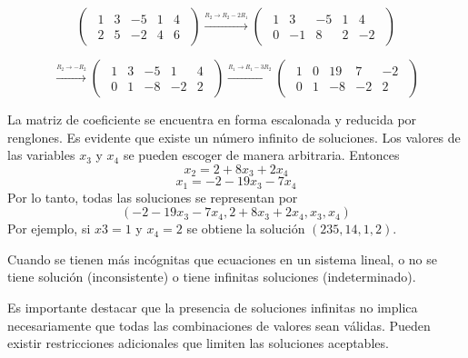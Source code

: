 \documentclass{article}
\begin{document}
\begin{equation*}
    \begin{pmatrix}
        \begin{array}{rrrr|r}
            1 & 3 & -5 & 1 & 4\\
            2 & 5 & -2 & 4 & 6
        \end{array}
    \end{pmatrix}
\xrightarrow{\stackrel{R_2 \rightarrow R_2 - 2R_1}{}}
    \begin{pmatrix}
        \begin{array}{rrrr|r}
            1 & 3 & -5 & 1 & 4\\
            0 & -1 & 8 & 2 & -2
        \end{array}
    \end{pmatrix}
\end{equation*}

\begin{equation*}
    \xrightarrow{\stackrel{R_2 \rightarrow -R_2}{}}
    \begin{pmatrix}
        \begin{array}{rrrr|r}
            1 & 3 & -5 & 1 & 4\\
            0 & 1 & -8 & -2 & 2
        \end{array}
    \end{pmatrix}
\xrightarrow{\stackrel{R_1 \rightarrow R_1 - 3R_2}{}}
    \begin{pmatrix}
        \begin{array}{rrrr|r}
            1 & 0 & 19 & 7 & -2\\
            0 & 1 & -8 & -2 & 2
        \end{array}
    \end{pmatrix}
\end{equation*}

La matriz de coeficiente se encuentra en forma escalonada y reducida por renglones. Es evidente que existe un número infinito de soluciones. Los valores de las variables $x_3$ y $x_4$ se pueden escoger de manera arbitraria. Entonces $$x_2 = 2 + 8x_3 + 2x_4$$ $$x_1 = -2 -19x_3 -7x_4$$ Por lo tanto, todas las soluciones se representan por $$(-2 -19x_3 -7x_4, 2 + 8x_3 + 2x_4, x_3, x_4)$$ Por ejemplo, si $x3 = 1$ y $x_4 = 2$ se obtiene la solución $(235, 14, 1, 2)$.

\begin{tcolorbox}[colback=green!20!white,colframe=green!80!black,title=Soluciones en un Sistema con más Incógnitas que Ecuaciones]
    Cuando se tienen más incógnitas que ecuaciones en un sistema lineal, o no se tiene solución (inconsistente) o tiene infinitas soluciones (indeterminado).

    Es importante destacar que la presencia de soluciones infinitas no implica necesariamente que todas las combinaciones de valores sean válidas. Pueden existir restricciones adicionales que limiten las soluciones aceptables.
\end{tcolorbox}
\end{document}
